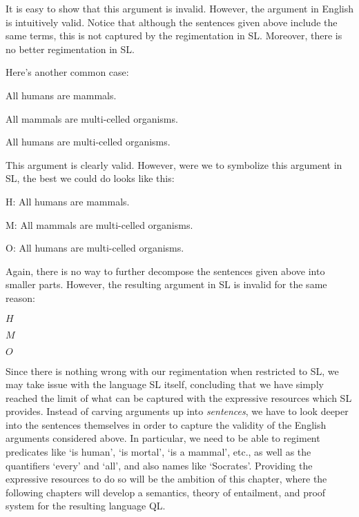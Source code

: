 It is easy to show that this argument is invalid.
However, the argument in English is intuitively valid.
Notice that although the sentences given above include the same terms, this is not captured by the regimentation in SL.
Moreover, there is no better regimentation in SL.

Here's another common case:

\begin{earg}
  \item[] All humans are mammals.
  \item[] All mammals are multi-celled organisms.
  \item[\therefore] All humans are multi-celled organisms.
\end{earg}

This argument is clearly valid.
However, were we to symbolize this argument in SL, the best we could do looks like this:

\begin{ekey}
  \item[H:] All humans are mammals.
  \item[M:] All mammals are multi-celled organisms.
  \item[O:] All humans are multi-celled organisms.
\end{ekey}

Again, there is no way to further decompose the sentences given above into smaller parts.
However, the resulting argument in SL is invalid for the same reason:

\begin{earg}
  \item[] $H$
  \item[] $M$
  \item[\therefore] $O$
\end{earg}

Since there is nothing wrong with our regimentation when restricted to SL, we may take issue with the language SL itself, concluding that we have simply reached the limit of what can be captured with the expressive resources which SL provides.
Instead of carving arguments up into \textit{sentences}, we have to look deeper into the sentences themselves in order to capture the validity of the English arguments considered above.
In particular, we need to be able to regiment predicates like `is human', `is mortal', `is a mammal', etc., as well as the quantifiers `every' and `all', and also names like `Socrates'.
Providing the expressive resources to do so will be the ambition of this chapter, where the following chapters will develop a semantics, theory of entailment, and proof system for the resulting language QL.

